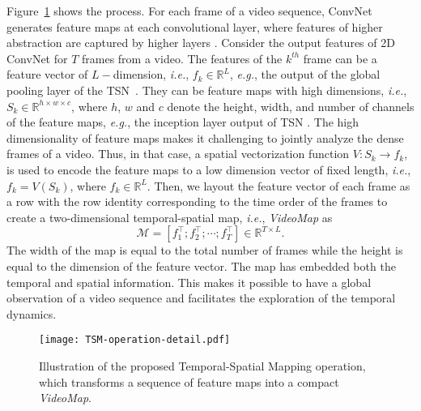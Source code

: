 \documentclass[english, 10pt, twocolumn, twoside]{IEEEtran}
\begin{document}
Figure~\ref{fig:TSM-operation-detail} shows the process. For each frame of a video sequence, ConvNet generates feature maps at each convolutional layer, where features of higher abstraction are captured by higher layers \cite{szegedy2015going}. Consider the output features of 2D ConvNet for $T$ frames from a video. The features of the $k^{th}$ frame can be a feature vector of $L-$dimension, \emph{i.e.}, $f_k \in \mathbb{R}^L$, \emph{e.g.}, the output of the global pooling layer of the TSN~\cite{wang2016temporal}. They can be feature maps with high dimensions, \emph{i.e.}, $S_k \in \mathbb{R}^{h\times w \times c}$, where $h$, $w$ and $c$ denote the height, width, and number of channels of the feature maps, \emph{e.g.}, the inception layer output of TSN \cite{wang2016temporal}. The high dimensionality of feature maps makes it challenging to jointly analyze the dense frames of a video. Thus, in that case, a spatial vectorization function $V: S_k \rightarrow f_k$, is used to encode the feature maps to a low dimension vector of fixed length, \emph{i.e.}, $f_k = V(S_k)$, where $f_k \in \mathbb{R}^L$.  Then, we layout the feature vector of each frame as a row with the row identity corresponding to the time order of the frames to create a two-dimensional temporal-spatial map, \emph{i.e.}, \emph{VideoMap} as
\begin{equation}
\mathcal{M} = [f_1^{\top}; f_2^{\top}; \cdots; f_T^{\top}] \in \mathbb{R}^{T \times L}.
\end{equation}
The width of the map is equal to the total number of frames while the height is equal to the dimension of the feature vector. The map has embedded both the temporal and spatial information. This makes it possible to have a global observation of a video sequence and facilitates the exploration of the temporal dynamics.

\begin{figure}[t]
\begin{center}
\texttt{[image: TSM-operation-detail.pdf]}
\end{center}
\vspace{-7mm}
\begin{center}
\caption[width=0.95\linewidth]{Illustration of the proposed Temporal-Spatial Mapping operation, which transforms a sequence of feature maps into a compact \emph{VideoMap}.}
\end{center}
\label{fig:TSM-operation-detail}
\end{figure}
\end{document}
